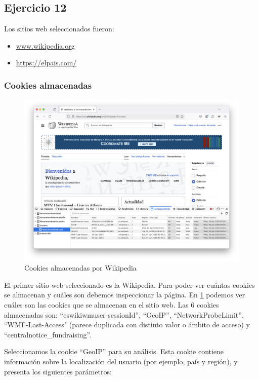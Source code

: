 \subsection{Ejercicio 12}
\graphicspath{ {img/12} }

Los sitios web seleccionados fueron:
\begin{itemize}
    \item \url{www.wikipedia.org}
    \item \url{https://elpais.com/}
\end{itemize}

\subsubsection{Cookies almacenadas}

\begin{figure}[H]
    \includegraphics[width=\textwidth]{cookies_wiki.png}
    \caption{Cookies almacenadas por Wikipedia}
    \label{fig:cookies_wiki}
\end{figure}

El primer sitio web seleccionado es la Wikipedia. Para poder ver cuántas cookies se almacenan y cuáles son debemos inspeccionar la página. En \ref{fig:cookies_wiki} podemos ver cuáles son las cookies que se almacenan en el sitio web. Las 6 cookies almacenadas son: “eswikiwmuser-sessionId”, “GeoIP”, “NetworkProbeLimit”, “WMF-Last-Access" (parece duplicada con distinto valor o ámbito de acceso) y “centralnotice_fundraising”.  

Seleccionamos la cookie “GeoIP” para su análisis. Esta cookie contiene información sobre la localización del usuario (por ejemplo, país y región), y presenta los siguientes parámetros: 

